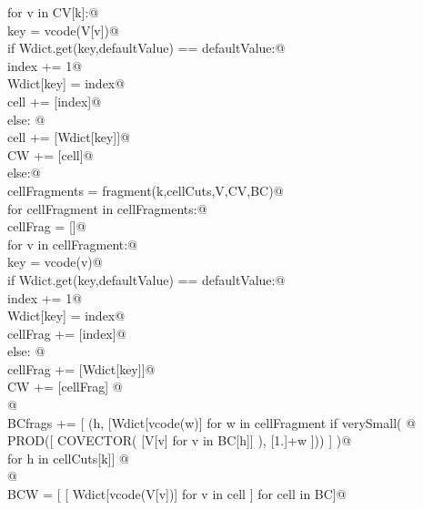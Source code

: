 \documentclass[11pt,oneside]{article}	%
\begin{document}
\begin{flushleft}
\begin{list}{}{}
\mbox{}\verb@         for v in CV[k]:@\\
\mbox{}\verb@            key = vcode(V[v])@\\
\mbox{}\verb@            if Wdict.get(key,defaultValue) == defaultValue:@\\
\mbox{}\verb@               index += 1@\\
\mbox{}\verb@               Wdict[key] = index@\\
\mbox{}\verb@               cell += [index]@\\
\mbox{}\verb@            else: @\\
\mbox{}\verb@               cell += [Wdict[key]]@\\
\mbox{}\verb@         CW += [cell]@\\
\mbox{}\verb@      else:@\\
\mbox{}\verb@         cellFragments = fragment(k,cellCuts,V,CV,BC)@\\
\mbox{}\verb@         for cellFragment in cellFragments:@\\
\mbox{}\verb@            cellFrag = []@\\
\mbox{}\verb@            for v in cellFragment:@\\
\mbox{}\verb@               key = vcode(v)@\\
\mbox{}\verb@               if Wdict.get(key,defaultValue) == defaultValue:@\\
\mbox{}\verb@                  index += 1@\\
\mbox{}\verb@                  Wdict[key] = index@\\
\mbox{}\verb@                  cellFrag += [index]@\\
\mbox{}\verb@               else: @\\
\mbox{}\verb@                  cellFrag += [Wdict[key]]@\\
\mbox{}\verb@            CW += [cellFrag]  @\\
\mbox{}\verb@            @\\
\mbox{}\verb@            BCfrags += [ (h, [Wdict[vcode(w)] for w in cellFragment if verySmall( @\\
\mbox{}\verb@                        PROD([ COVECTOR( [V[v] for v in BC[h]] ), [1.]+w ])) ] )@\\
\mbox{}\verb@                      for h in cellCuts[k]]  @\\
\mbox{}\verb@   @\\
\mbox{}\verb@   BCW = [ [ Wdict[vcode(V[v])] for v in cell ] for cell in BC]@\\

\end{list}
\end{flushleft}
\end{document}
